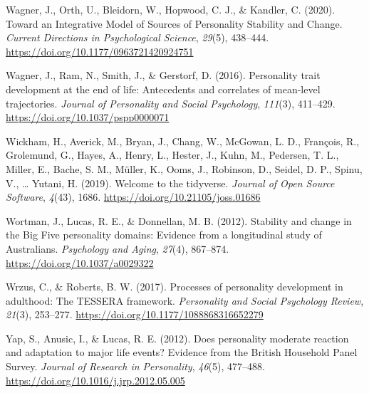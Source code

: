 \documentclass[
  english,
  man, noextraspace,floatsintext]{apa7}
\begin{document}
\leavevmode\hypertarget{ref-wagnerIntegrativeModelSources2020}{}%
Wagner, J., Orth, U., Bleidorn, W., Hopwood, C. J., \& Kandler, C. (2020). Toward an Integrative Model of Sources of Personality Stability and Change. \emph{Current Directions in Psychological Science}, \emph{29}(5), 438--444. \url{https://doi.org/10.1177/0963721420924751}

\leavevmode\hypertarget{ref-wagnerPersonalityTraitDevelopment2016}{}%
Wagner, J., Ram, N., Smith, J., \& Gerstorf, D. (2016). Personality trait development at the end of life: Antecedents and correlates of mean-level trajectories. \emph{Journal of Personality and Social Psychology}, \emph{111}(3), 411--429. \url{https://doi.org/10.1037/pspp0000071}

\leavevmode\hypertarget{ref-tidyverse2019}{}%
Wickham, H., Averick, M., Bryan, J., Chang, W., McGowan, L. D., François, R., Grolemund, G., Hayes, A., Henry, L., Hester, J., Kuhn, M., Pedersen, T. L., Miller, E., Bache, S. M., Müller, K., Ooms, J., Robinson, D., Seidel, D. P., Spinu, V., \ldots{} Yutani, H. (2019). Welcome to the tidyverse. \emph{Journal of Open Source Software}, \emph{4}(43), 1686. \url{https://doi.org/10.21105/joss.01686}

\leavevmode\hypertarget{ref-wortmanStabilityChangeBig2012}{}%
Wortman, J., Lucas, R. E., \& Donnellan, M. B. (2012). Stability and change in the Big Five personality domains: Evidence from a longitudinal study of Australians. \emph{Psychology and Aging}, \emph{27}(4), 867--874. \url{https://doi.org/10.1037/a0029322}

\leavevmode\hypertarget{ref-wrzusProcessesPersonalityDevelopment2017}{}%
Wrzus, C., \& Roberts, B. W. (2017). Processes of personality development in adulthood: The TESSERA framework. \emph{Personality and Social Psychology Review}, \emph{21}(3), 253--277. \url{https://doi.org/10.1177/1088868316652279}

\leavevmode\hypertarget{ref-yapDoesPersonalityModerate2012}{}%
Yap, S., Anusic, I., \& Lucas, R. E. (2012). Does personality moderate reaction and adaptation to major life events? Evidence from the British Household Panel Survey. \emph{Journal of Research in Personality}, \emph{46}(5), 477--488. \url{https://doi.org/10.1016/j.jrp.2012.05.005}

\endgroup


\clearpage
\makeatletter
\efloat@restorefloats
\makeatother
\end{document}
